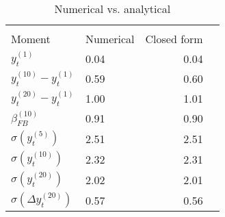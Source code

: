 \begin{table}[htbp]\centering  
 \bgroup  
 \def\arraystretch{1.25}\caption{Numerical vs. analytical} 
\begin{tabular}{llrr} 
\hline\hline 
\multicolumn{3}{c}{} \\ 
Moment & Numerical  & Closed form \\ 
\hline 
$y_{t}^{(1)}$ & 0.04 & 0.04  \\ 
$y_{t}^{(10)}-y_{t}^{(1)}$ & 0.59 &  0.60  \\ 
$y_{t}^{(20)}-y_{t}^{(1)}$ & 1.00 &  1.01  \\ 
$ \beta^{(10)}_{FB}$ & 0.91 & 0.90 \\ 
$\sigma(y_{t}^{(5)})$ & 2.51 & 2.51  \\ 
$\sigma(y_{t}^{(10)})$ & 2.32 & 2.31  \\ 
$\sigma(y_{t}^{(20)})$ & 2.02 & 2.01  \\ 
$\sigma(\Delta y_{t}^{(20)})$ & 0.57 & 0.56  \\ 
\hline\hline 
\end{tabular} 
 \egroup 
\end{table} 
